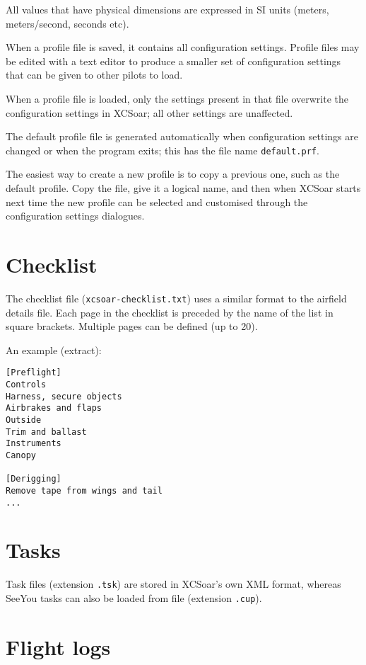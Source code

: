 All values that have physical dimensions are expressed in SI units
(meters, meters/second, seconds etc).

When a profile file is saved, it contains all configuration settings.
Profile files may be edited with a text editor to produce a smaller
set of configuration settings that can be given to other pilots to
load.  

When a profile file is loaded, only the settings present in that file
overwrite the configuration settings in XCSoar; all other settings are
unaffected.

The default profile file is generated automatically when configuration
settings are changed or when the program exits; this has the
file name \verb|default.prf|.

The easiest way to create a new profile is to copy a previous one,
such as the default profile.  Copy the file, give it a logical name,
and then when XCSoar starts next time the new profile can be selected
and customised through the configuration settings dialogues.


\section{Checklist}\label{sec:checklist-file}

The checklist file (\verb|xcsoar-checklist.txt|) uses a similar format to
the airfield details file.  Each page in the checklist is preceded by
the name of the list in square brackets.  Multiple pages can be
defined (up to 20).

An example (extract):
\begin{verbatim}
[Preflight]
Controls
Harness, secure objects
Airbrakes and flaps
Outside
Trim and ballast
Instruments
Canopy

[Derigging]
Remove tape from wings and tail
...
\end{verbatim}

\section{Tasks}

Task files (extension \verb|.tsk|) are stored in XCSoar's own XML format,
whereas SeeYou tasks can also be loaded from file (extension \verb|.cup|).

\section{Flight logs} \label{sec:logfiles}

